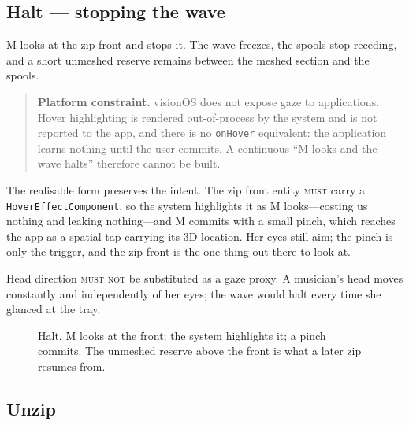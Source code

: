 \documentclass[11pt,a4paper]{article}
\newcommand{\MUST}{\textsc{must}}
\newcommand{\MUSTNOT}{\textsc{must not}}
\theoremstyle{definition}
\theoremstyle{plain}
\theoremstyle{remark}
\newcommand{\spools}{%
  \fill[ribL,opacity=.45,rounded corners=2pt] (1.55,5.40) rectangle (2.45,5.95);
  \fill[ribR,opacity=.45,rounded corners=2pt] (5.55,5.40) rectangle (6.45,5.95);
  \node[font=\scriptsize] at (2,6.22) {left spool};
  \node[font=\scriptsize] at (6,6.22) {right spool};
}
\newcommand{\musician}{%
  \draw[gray] (4,-0.10) circle (0.23);
  \node[font=\scriptsize] at (4,-0.10) {M};
}
\newcommand{\axes}{%
  \draw[->,gray,thin] (0.85,4.30) -- (1.45,4.30) node[right,font=\scriptsize]{$x$};
  \draw[->,gray,thin] (0.85,4.30) -- (0.85,4.90) node[above,font=\scriptsize]{$z$};
}
\newcommand{\ribbonszipped}{%
  \draw[ribL,opacity=.45,line width=16pt,line join=round]
    (2,5.40) -- (2,4.60) -- (3.72,4.20) -- (3.72,2.20) -- (3.10,1.70) -- (3.10,0.70);
  \draw[ribR,opacity=.45,line width=16pt,line join=round]
    (6,5.40) -- (6,4.60) -- (4.28,4.20) -- (4.28,2.20) -- (4.90,1.70) -- (4.90,0.70);
}
\newcommand{\mesh}[2]{%
  \draw[gray!75,decorate,decoration={zigzag,segment length=5pt,amplitude=3pt}]
    (4,#1) -- (4,#2);
}
\newcommand{\handat}[2]{\filldraw[fill=white,draw=gray!80,thin] (#1,#2) circle (0.17);}
\newcommand{\handsdefault}{\handat{3.10}{0.55}\handat{4.90}{0.55}}
\begin{document}
\subsection{Halt --- stopping the wave}
\label{sec:halt}

M looks at the zip front and stops it. The wave freezes, the spools stop receding, and a short
unmeshed reserve remains between the meshed section and the spools.

\begin{quote}
\textbf{Platform constraint.} visionOS does not expose gaze to applications. Hover highlighting is
rendered out-of-process by the system and is not reported to the app, and there is no
\texttt{onHover} equivalent: the application learns nothing until the user commits. A continuous
``M looks and the wave halts'' therefore cannot be built.
\end{quote}

\begin{sloppypar}
The realisable form preserves the intent. The zip front entity \MUST{} carry a
\texttt{HoverEffectComponent}, so the system highlights it as M looks---costing us nothing and
leaking nothing---and M commits with a small pinch, which reaches the app as a spatial tap
carrying its 3D location. Her eyes still aim; the pinch is only the trigger, and the zip front
is the one thing out there to look at.
\end{sloppypar}

Head direction \MUSTNOT{} be substituted as a gaze proxy. A musician's head moves constantly and
independently of her eyes; the wave would halt every time she glanced at the tray.

\begin{figure}[H]\centering
{}
\caption{Halt. M looks at the front; the system highlights it; a pinch commits. The unmeshed
reserve above the front is what a later zip resumes from.}
\end{figure}

\subsection{Unzip}
\end{document}
